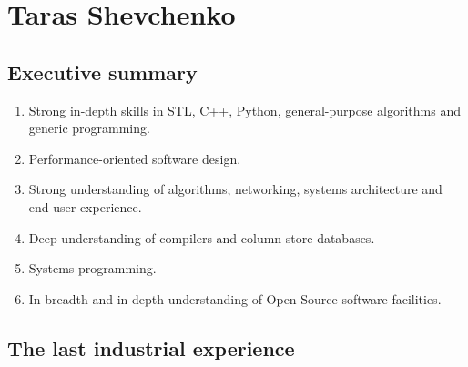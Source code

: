 \documentclass[a4paper,12pt,final]{extreport}
\begin{document}
\section{Taras Shevchenko}
\subsection{Executive summary}
\begin{enumerate}
  \item Strong in-depth skills in STL, C++, Python, general-purpose algorithms and generic programming.
  \item Performance-oriented software design.
  \item Strong understanding of algorithms, networking, systems architecture and end-user experience.
  \item Deep understanding of compilers and column-store databases.
  \item Systems programming.
  \item In-breadth and in-depth understanding of Open Source software facilities.
\end{enumerate}

\subsection{The last industrial experience}
\end{document}

